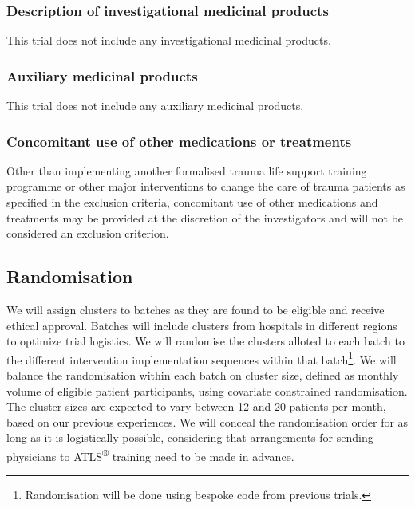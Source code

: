 \documentclass[
]{scrartcl}
\begin{document}
\hypertarget{description-of-investigational-medicinal-products}{%
\subsubsection{Description of investigational medicinal
products}\label{description-of-investigational-medicinal-products}}

This trial does not include any investigational medicinal products.

\hypertarget{auxiliary-medicinal-products}{%
\subsubsection{Auxiliary medicinal
products}\label{auxiliary-medicinal-products}}

This trial does not include any auxiliary medicinal products.

\hypertarget{concomitant-use-of-other-medications-or-treatments}{%
\subsubsection{Concomitant use of other medications or
treatments}\label{concomitant-use-of-other-medications-or-treatments}}

Other than implementing another formalised trauma life support training
programme or other major interventions to change the care of trauma
patients as specified in the exclusion criteria, concomitant use of
other medications and treatments may be provided at the discretion of
the investigators and will not be considered an exclusion criterion.

\hypertarget{randomisation}{%
\subsection{Randomisation}\label{randomisation}}

We will assign clusters to batches as they are found to be eligible and
receive ethical approval. Batches will include clusters from hospitals
in different regions to optimize trial logistics. We will randomise the
clusters alloted to each batch to the different intervention
implementation sequences within that batch\footnote{Randomisation will
  be done using bespoke code from previous trials.}. We will balance the
randomisation within each batch on cluster size, defined as monthly
volume of eligible patient participants, using covariate constrained
randomisation. The cluster sizes are expected to vary between 12 and 20
patients per month, based on our previous experiences. We will conceal
the randomisation order for as long as it is logistically possible,
considering that arrangements for sending physicians to
ATLS\textsuperscript{®} training need to be made in advance.
\end{document}
